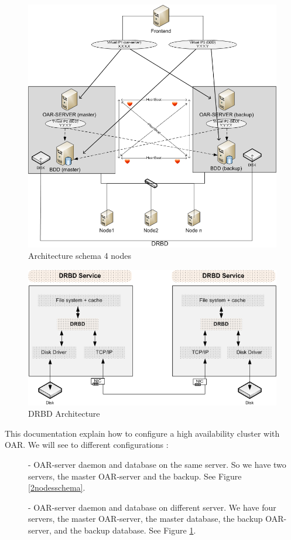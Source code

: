 \documentclass[a4paper,10pt]{report}
\begin{document}
\begin{figure}
\includegraphics[scale=0.5]{schema/architecture-schema-4-node.png}
\caption{Architecture schema 4 nodes} 
\label{4nodesschema} 
\end{figure} 
\begin{figure}
\centering
\includegraphics[scale=0.5]{schema/DRBD.png}
\caption{DRBD Architecture} 
\label{drbd} 
\end{figure} 



This documentation explain how to configure a high availability cluster with OAR. We will see to different configurations :
\begin{description}
\item[]- OAR-server daemon and database on the same server. So we have two servers, the master OAR-server and the backup. See Figure \ref{2nodesschema}.


\item[]- OAR-server daemon and database on different server. We have four servers, the master OAR-server, the master database, the backup OAR-server, and the backup database.
See Figure \ref{4nodesschema}.

\end{description}
\end{document}
